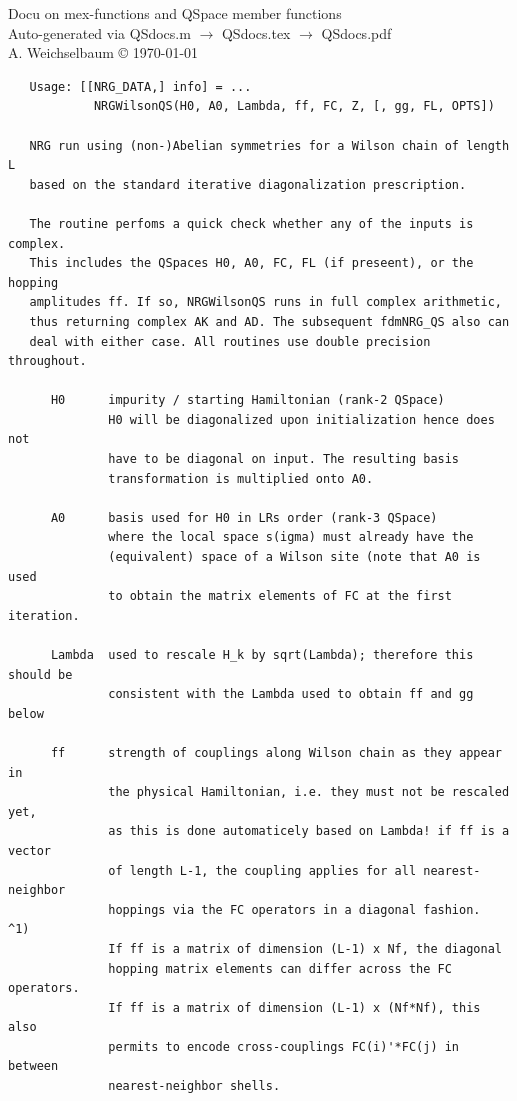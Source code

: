 \documentclass[twoside,12pt]{article}
\begin{document}
\noindent Docu on mex-functions and QSpace member functions\\
Auto-generated via QSdocs.m $\to$ QSdocs.tex $\to$ QSdocs.pdf\\
A. Weichselbaum \copyright{} \today

\tableofcontents

\newpage




\pagebreak[3]



\begin{verbatim}
   Usage: [[NRG_DATA,] info] = ...
            NRGWilsonQS(H0, A0, Lambda, ff, FC, Z, [, gg, FL, OPTS])
 
   NRG run using (non-)Abelian symmetries for a Wilson chain of length L
   based on the standard iterative diagonalization prescription.
 
   The routine perfoms a quick check whether any of the inputs is complex.
   This includes the QSpaces H0, A0, FC, FL (if preseent), or the hopping
   amplitudes ff. If so, NRGWilsonQS runs in full complex arithmetic,
   thus returning complex AK and AD. The subsequent fdmNRG_QS also can
   deal with either case. All routines use double precision throughout.
 
      H0      impurity / starting Hamiltonian (rank-2 QSpace)
              H0 will be diagonalized upon initialization hence does not
              have to be diagonal on input. The resulting basis
              transformation is multiplied onto A0.
 
      A0      basis used for H0 in LRs order (rank-3 QSpace)
              where the local space s(igma) must already have the
              (equivalent) space of a Wilson site (note that A0 is used
              to obtain the matrix elements of FC at the first iteration.
 
      Lambda  used to rescale H_k by sqrt(Lambda); therefore this should be
              consistent with the Lambda used to obtain ff and gg below
 
      ff      strength of couplings along Wilson chain as they appear in
              the physical Hamiltonian, i.e. they must not be rescaled yet,
              as this is done automaticely based on Lambda! if ff is a vector
              of length L-1, the coupling applies for all nearest-neighbor
              hoppings via the FC operators in a diagonal fashion.     ^1)
              If ff is a matrix of dimension (L-1) x Nf, the diagonal
              hopping matrix elements can differ across the FC operators.
              If ff is a matrix of dimension (L-1) x (Nf*Nf), this also
              permits to encode cross-couplings FC(i)'*FC(j) in between
              nearest-neighbor shells.
 

\end{verbatim}
\end{document}
